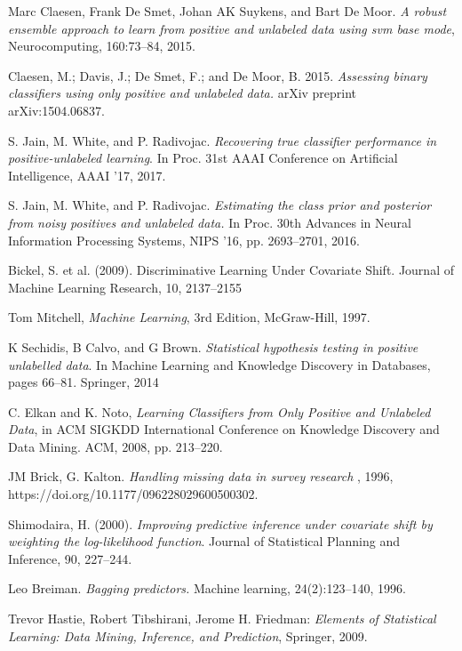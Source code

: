 \begin{thebibliography}{9}
Marc Claesen, Frank De Smet, Johan AK Suykens, and Bart De Moor. \textit{A robust ensemble approach to learn from positive and unlabeled data using svm base mode}, Neurocomputing, 160:73–84, 2015.

Claesen, M.; Davis, J.; De Smet, F.; and De Moor, B. 2015. \textit{Assessing binary classifiers using only positive and unlabeled data.} arXiv preprint arXiv:1504.06837.

S. Jain, M. White, and P. Radivojac. \textit{Recovering true classifier performance in positive-unlabeled learning}. In Proc. 31st AAAI Conference on Artificial Intelligence, AAAI '17, 2017.

S. Jain, M. White, and P. Radivojac. \textit{Estimating the class prior and posterior from noisy positives and unlabeled data.} In Proc. 30th Advances in Neural Information Processing Systems, NIPS '16, pp. 2693–2701, 2016.

Bickel, S. et al. (2009). Discriminative Learning Under Covariate Shift. Journal of Machine Learning Research, 10, 2137–2155

Tom Mitchell, \textit{Machine Learning}, 3rd Edition, McGraw-Hill, 1997.

K Sechidis, B Calvo, and G Brown. \textit{Statistical hypothesis testing in positive unlabelled data}. In Machine Learning and Knowledge Discovery in Databases, pages 66–81. Springer, 2014

C. Elkan and K. Noto, \textit{Learning Classifiers from Only Positive and Unlabeled Data}, in ACM SIGKDD International Conference on Knowledge Discovery and Data Mining. ACM, 2008, pp. 213–220.

JM Brick, G. Kalton. \textit{Handling missing data in survey research }, 1996, https://doi.org/10.1177/096228029600500302.

Shimodaira, H. (2000). \textit{Improving predictive inference under covariate shift by weighting the log-likelihood function}. Journal of Statistical Planning and Inference, 90, 227–244.

Leo Breiman. \textit{Bagging predictors.} Machine learning, 24(2):123–140, 1996.

Trevor Hastie, Robert Tibshirani, Jerome H. Friedman: \textit{Elements of Statistical Learning: Data Mining, Inference, and Prediction}, Springer, 2009.


\end{thebibliography}
